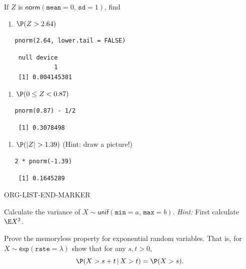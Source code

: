 \documentclass[captions=tableheading]{scrbook}
\begin{document}
\begin{xca}
If \(Z\) is \(\mathsf{norm}(\mathtt{mean}=0,\,\mathtt{sd}=1)\), find 
\begin{enumerate}
\item \(\P(Z>2.64)\)
\end{enumerate}

\begin{verbatim}
   pnorm(2.64, lower.tail = FALSE)
\end{verbatim}

\begin{verbatim}
    null device 
              1
    [1] 0.004145301
\end{verbatim}

\begin{enumerate}
\item \(\P(0\leq Z<0.87)\)
\end{enumerate}

\begin{verbatim}
   pnorm(0.87) - 1/2
\end{verbatim}

\begin{verbatim}
    [1] 0.3078498
\end{verbatim}

\begin{enumerate}
\item \(\P(|Z|>1.39)\) (Hint: draw a picture!)
\end{enumerate}

\begin{verbatim}
   2 * pnorm(-1.39)
\end{verbatim}

\begin{verbatim}
    [1] 0.1645289
\end{verbatim}

ORG-LIST-END-MARKER

\end{xca}

\begin{xca}
\label{xca:variance-dunif}
Calculate the variance of \(X\sim\mathsf{unif}(\mathtt{min}=a,\,\mathtt{max}=b)\). \emph{Hint:} First calculate \(\E X^{2}\).
\end{xca}

\begin{xca}
\label{xca:prove-the-memoryless}
Prove the memoryless property for exponential random variables. That is, for \(X\sim\mathsf{exp}(\mathtt{rate}=\lambda)\) show that for any \(s,t>0\),
\[
\P(X>s+t\,|\, X>t)=\P(X>s).
\]
\end{xca}
\end{document}
